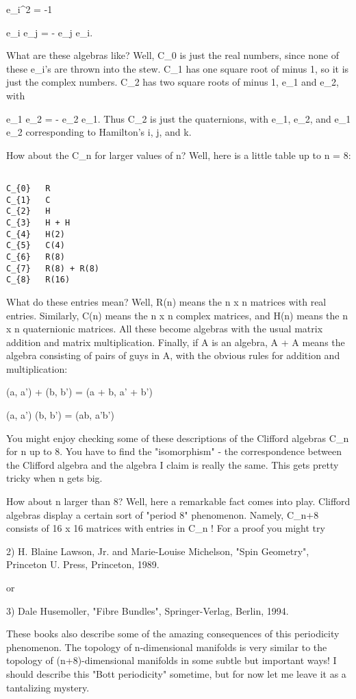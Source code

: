 e_{i}^{2} = -1

e_{i} e_{j} = - e_{j} e_{i}.

What are these algebras like?  Well, C_{0} 
is just the real numbers, since
none of these e_{i}'s are thrown into the stew.  C_{1} 
has one square root of minus 1, so it is just the complex numbers.  
C_{2} has two square roots of minus 1, e_{1} and e_{2},
with 

e_{1} e_{2} = - e_{2} e_{1}.
Thus C_{2} is just the quaternions, with 
e_{1}, e_{2}, and e_{1} e_{2} corresponding
to Hamilton's i, j, and k.  

How about the C_{n} for larger values of n?  
Well, here is a little table up to n = 8:

\begin{verbatim}

C_{0}   R
C_{1}   C
C_{2}   H
C_{3}   H + H
C_{4}   H(2) 
C_{5}   C(4)
C_{6}   R(8)
C_{7}   R(8) + R(8)
C_{8}   R(16)
\end{verbatim}
    
What do these entries mean?  Well, R(n) means the n x n matrices with
real entries.  Similarly, C(n) means the n x n complex matrices, and
H(n) means the n x n quaternionic matrices.  All these become algebras
with the usual matrix addition and matrix multiplication.  Finally, if A
is an algebra, A + A means the algebra consisting of pairs of guys in A,
with the obvious rules for addition and multiplication:

(a, a') + (b, b') = (a + b, a' + b')

(a, a') (b, b') = (ab, a'b')

You might enjoy checking some of these descriptions of the Clifford
algebras C_{n} for n up to 8.  You have to find the 
"isomorphism" - the
correspondence between the Clifford algebra and the algebra I claim is
really the same.  This gets pretty tricky when n gets big.  

How about n larger than 8?  Well, here a remarkable fact comes into
play.  Clifford algebras display a certain sort of "period 8"
phenomenon.  Namely, C_{n+8} consists of 16 x 16 matrices with entries
in C_{n} !   For a proof you might try 

2) H. Blaine Lawson, Jr. and Marie-Louise Michelson, "Spin Geometry",
Princeton U. Press, Princeton, 1989.

or

3) Dale Husemoller, "Fibre Bundles", Springer-Verlag, Berlin, 1994.

These books also describe some of the amazing consequences of this
periodicity phenomenon.  The topology of n-dimensional manifolds is very
similar to the topology of (n+8)-dimensional manifolds in some subtle
but important ways!  I should describe this "Bott periodicity" sometime,
but for now let me leave it as a tantalizing mystery.  

